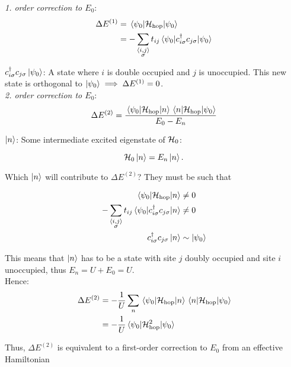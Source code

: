 \emph{1. order correction to $E_0$}:
\begin{align}
	\Delta E^{(1)} &= \mel{\psi_0}{\mathcal{H}_{\text{hop}}}{\psi_0} \\
	&= - \sum_{\substack{\langle i, j \rangle \\ \sigma}} t_{ij} \mel{\psi_0}{c_{i\sigma}^\dagger c_{j\sigma}}{\psi_0}
\end{align}

$c_{i\sigma}^\dagger c_{j\sigma}\ket{{\psi_0}}$: A state where $i$ is double occupied and $j$ is unoccupied. This new state is orthogonal to $\ket{\psi_0} \implies \Delta E^{(1)} = 0$. \\

\emph{2. order correction to $E_0$}:
\begin{equation}
	\Delta E^{(2)} = \frac{\mel{\psi_0}{\mathcal{H}_{\text{hop}}}{n} \mel{n}{\mathcal{H}_{\text{hop}}}{\psi_0}}{E_0 - E_n}
\end{equation}

$\ket{n}$: Some intermediate excited eigenstate of $\mathcal{H}_0$:

\begin{equation}
	\mathcal{H}_0\ket{n} = E_n\ket{n}.
\end{equation}

Which $\ket{n}$ will contribute to $\Delta E^{(2)}$? They must be such that

\begin{align}
	\mel{\psi_0}{\mathcal{H}_{\text{hop}}}{n} &\ne 0 \\
	- \sum_{\substack{\langle i, j \rangle \\ \sigma}} t_{ij} \mel{\psi_0}{c_{i\sigma}^\dagger c_{j\sigma}}{n} & \ne 0 \\
	c_{i \sigma}^\dagger c_{j \sigma}\ket{n} & \sim \ket{\psi_0}
\end{align}

This means that $\ket{n}$ has to be a state with site $j$ doubly occupied and site $i$ unoccupied, thus $E_n = U + E_0 = U$.\\

Hence:
\begin{align}
	\Delta E^{(2)} &= -\frac{1}{U}\sum_n \mel{\psi_0}{\mathcal{H}_{\text{hop}}}{n}\mel{n}{\mathcal{H}_{\text{hop}}}{\psi_0} \\
	&= -\frac{1}{U} \mel{\psi_0}{\mathcal{H}_{\text{hop}}^2}{\psi_0}
\end{align}

Thus, $\Delta E^{(2)}$ is equivalent to a first-order correction to $E_0$ from an effective Hamiltonian

